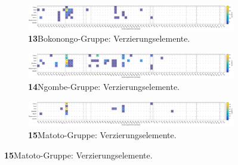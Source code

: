 \addtocounter{figure}{-1}
\begin{figure}

\begin{subfigure}{\textwidth}
	\setcounter{subfigure}{12}
	\centering
	\includegraphics[width=\textwidth]{fig/BOG_Verzierungselmente.pdf}
	\caption*{\textbf{13}\hspace{1em}Bokonongo-Gruppe: Verzierungselemente. \vspace{\baselineskip}}
	\label{fig:BOG_Verz}
\end{subfigure}

\begin{subfigure}{\textwidth}
	\centering
	\includegraphics[width=\textwidth]{fig/NGO_Verzierungselmente.pdf}
	\caption*{\textbf{14}\hspace{1em}Ngombe-Gruppe: Verzierungselemente. \vspace{\baselineskip}}
	\label{fig:NGO_Verz}
\end{subfigure}

\begin{subfigure}{\textwidth}
	\centering
	\includegraphics[width=\textwidth]{fig/MAT_Verzierungselmente.pdf}
	\caption*{\textbf{15}\hspace{1em}Matoto-Gruppe: Verzierungselemente. \vspace{\baselineskip}}
	\label{fig:MAT_Verz}
\end{subfigure}
\end{figure}

